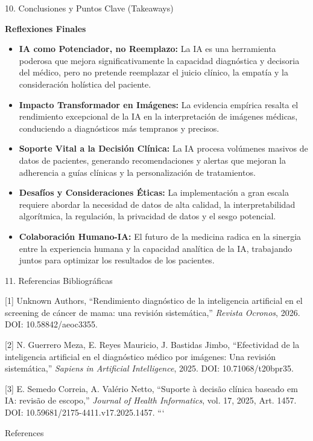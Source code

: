 \documentclass[aspectratio=169]{beamer}
\begin{document}
\begin{frame}[fragile]{10. Conclusiones y Puntos Clave (Takeaways)}


\textbf{Reflexiones Finales}
\begin{itemize}
  \item \textbf{IA como Potenciador, no Reemplazo:} La IA es una herramienta poderosa que mejora significativamente la capacidad diagnóstica y decisoria del médico, pero no pretende reemplazar el juicio clínico, la empatía y la consideración holística del paciente.
  \item \textbf{Impacto Transformador en Imágenes:} La evidencia empírica resalta el rendimiento excepcional de la IA en la interpretación de imágenes médicas, conduciendo a diagnósticos más tempranos y precisos.
  \item \textbf{Soporte Vital a la Decisión Clínica:} La IA procesa volúmenes masivos de datos de pacientes, generando recomendaciones y alertas que mejoran la adherencia a guías clínicas y la personalización de tratamientos.
  \item \textbf{Desafíos y Consideraciones Éticas:} La implementación a gran escala requiere abordar la necesidad de datos de alta calidad, la interpretabilidad algorítmica, la regulación, la privacidad de datos y el sesgo potencial.
  \item \textbf{Colaboración Humano-IA:} El futuro de la medicina radica en la sinergia entre la experiencia humana y la capacidad analítica de la IA, trabajando juntos para optimizar los resultados de los pacientes.
\end{itemize}
\end{frame}



\begin{frame}[fragile]{11. Referencias Bibliográficas}


[1] Unknown Authors, ``Rendimiento diagnóstico de la inteligencia artificial en el screening de cáncer de mama: una revisión sistemática,'' \textit{Revista Ocronos}, 2026. DOI: 10.58842/aeoc3355.

[2] N. Guerrero Meza, E. Reyes Mauricio, J. Bastidas Jimbo, ``Efectividad de la inteligencia artificial en el diagnóstico médico por imágenes: Una revisión sistemática,'' \textit{Sapiens in Artificial Intelligence}, 2025. DOI: 10.71068/t20bpr35.

[3] E. Semedo Correia, A. Valério Netto, ``Suporte à decisão clínica baseado em IA: revisão de escopo,'' \textit{Journal of Health Informatics}, vol. 17, 2025, Art. 1457. DOI: 10.59681/2175-4411.v17.2025.1457.
```
\end{frame}




\begin{frame}[allowframebreaks]{References}
  
  
\end{frame}
\end{document}
